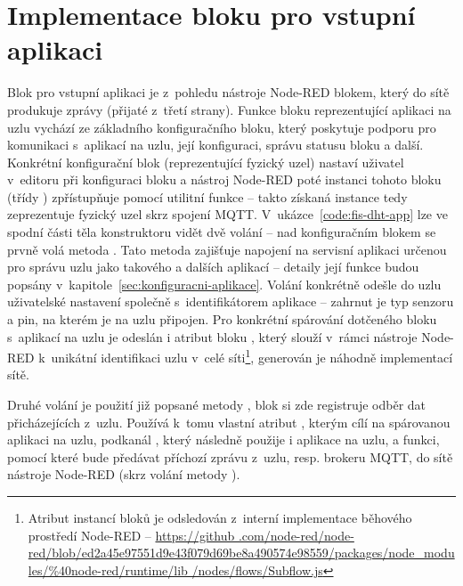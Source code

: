 \section{Implementace bloku pro vstupní aplikaci}\label{sec:implementace-bloku-pro-vstupni-aplikaci}
Blok pro vstupní aplikaci je z~pohledu nástroje Node-RED blokem, který do sítě produkuje zprávy (přijaté z~třetí
strany).
Funkce bloku reprezentující aplikaci na uzlu vychází ze základního konfiguračního bloku, který poskytuje podporu pro
komunikaci s~aplikací na uzlu, její konfiguraci, správu statusu bloku a další.
Konkrétní konfigurační blok (reprezentující fyzický uzel) nastaví uživatel v~editoru při konfiguraci bloku a nástroj
Node-RED poté instanci tohoto bloku (třídy ) zpřístupňuje pomocí utilitní funkce
\mbox{} -- takto získaná instance tedy zeprezentuje fyzický uzel skrz spojení MQTT.
V~ukázce~\ref{code:fis-dht-app} lze ve spodní části těla konstruktoru vidět dvě volání -- nad konfiguračním blokem se
prvně volá metoda .
Tato metoda zajišťuje napojení na servisní aplikaci určenou pro správu uzlu jako takového a dalších aplikací --
detaily její funkce budou popsány v~kapitole~\ref{sec:konfiguracni-aplikace}.
Volání konkrétně odešle do uzlu uživatelské nastavení společně s~identifikátorem aplikace  -- zahrnut
je typ senzoru a pin, na kterém je na uzlu připojen.
Pro konkrétní spárování dotčeného bloku s~aplikací na uzlu je odeslán i atribut bloku , který slouží
v~rámci nástroje Node-RED k~unikátní identifikaci uzlu v~celé síti\footnote{Atribut  instancí bloků je
odsledován z~interní implementace běhového prostředí Node-RED -- \url{https://github
.com/node-red/node-red/blob/ed2a45e97551d9e43f079d69be8a490574e98559/packages/node_modules/\%40node-red/runtime/lib
/nodes/flows/Subflow.js}}, generován je náhodně implementací sítě.

Druhé volání je použití již popsané metody , blok si zde registruje odběr dat přicházejících
z~uzlu.
Používá k~tomu vlastní atribut , kterým cílí na spárovanou aplikaci na uzlu, podkanál , který
následně použije i aplikace na uzlu, a funkci, pomocí které bude předávat příchozí zprávu z~uzlu, resp. brokeru MQTT,
do sítě nástroje Node-RED (skrz volání metody ).

